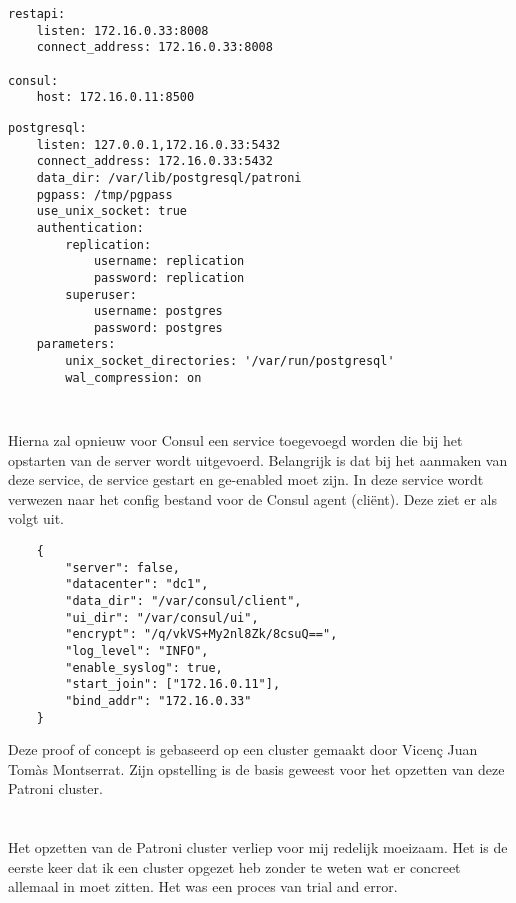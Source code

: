 \begin{lstlisting}
restapi:
    listen: 172.16.0.33:8008
    connect_address: 172.16.0.33:8008

consul:
    host: 172.16.0.11:8500
\end{lstlisting}

\begin{lstlisting}
postgresql:
    listen: 127.0.0.1,172.16.0.33:5432
    connect_address: 172.16.0.33:5432
    data_dir: /var/lib/postgresql/patroni
    pgpass: /tmp/pgpass
    use_unix_socket: true
    authentication:
        replication:
            username: replication
            password: replication
        superuser:
            username: postgres
            password: postgres
    parameters:
        unix_socket_directories: '/var/run/postgresql'
        wal_compression: on
\end{lstlisting}


\begin{lstlisting}
    
\end{lstlisting}




Hierna zal opnieuw voor Consul een service toegevoegd worden die bij het opstarten van de server wordt uitgevoerd. Belangrijk is dat bij het aanmaken van deze service, de service gestart en ge-enabled moet zijn. In deze service wordt verwezen naar het config bestand voor de Consul agent (cliënt). Deze ziet er als volgt uit.

\begin{lstlisting}
    {
        "server": false,
        "datacenter": "dc1",
        "data_dir": "/var/consul/client",
        "ui_dir": "/var/consul/ui",
        "encrypt": "/q/vkVS+My2nl8Zk/8csuQ==", 
        "log_level": "INFO",
        "enable_syslog": true,
        "start_join": ["172.16.0.11"],
        "bind_addr": "172.16.0.33"
    }
\end{lstlisting}



Deze proof of concept is gebaseerd op een cluster gemaakt door Vicenç Juan Tomàs Montserrat. Zijn opstelling is de basis geweest voor het opzetten van deze Patroni cluster.


\section{}
\label{sec:Persoonlijke conclusie}

Het opzetten van de Patroni cluster verliep voor mij redelijk moeizaam. Het is de eerste keer dat ik een cluster opgezet heb zonder te weten wat er concreet allemaal in moet zitten. Het was een proces van trial and error.


